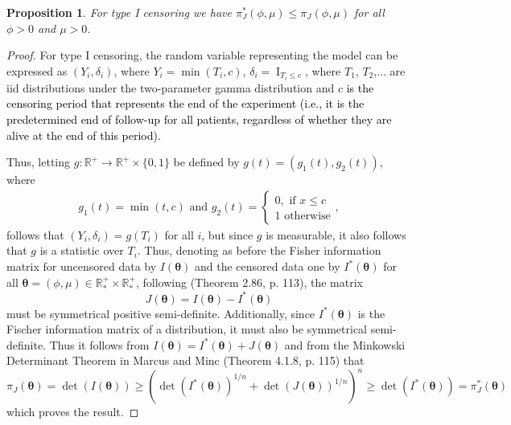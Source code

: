 \documentclass[]{interact}
\newcommand{\f}{\operatorname}
\newcommand{\R}{\mathbb{R}}
\theoremstyle{plain}%
\newtheorem{proposition}[theorem]{Proposition}
\theoremstyle{definition}
\theoremstyle{remark}
\begin{document}
\begin{proposition}\label{jeffreycens} For type I censoring we have $\pi_{J}^*(\phi,\mu)\leq \pi_J(\phi,\mu)$ for all $\phi>0$ and $\mu>0$.
\end{proposition}
\begin{proof} For type I censoring, the random variable representing the model can be expressed as $(Y_i,\delta_i)$, where $Y_i=\min(T_i,c)$, $\delta_i=\f{I}_{T_i\leq c}$, where $T_1$, $T_2$,$\ldots$ are iid distributions under the two-parameter gamma distribution and $c$ \textcolor{black}{is the censoring period that represents the end of the experiment (i.e., it is the predetermined end of follow-up for all patients, regardless of whether they are alive at the end of this period).}

Thus, letting $g:\R^+\to \R^+\times \{0,1\}$ be defined by $g(t)=(g_1(t),g_2(t))$, where
\begin{equation*}
\begin{aligned}
g_1(t) = \min(t,c)\mbox{ and }
g_2(t) = \begin{cases}0,\mbox{ if }x\leq c\\
1\mbox{ otherwise}
\end{cases},
\end{aligned}
\end{equation*}
follows that $(Y_i,\delta_i) = g(T_i)$ for all $i$, but since $g$ is measurable, it also follows that $g$ is a statistic over $T_i$. Thus, denoting as before the Fisher information matrix for uncensored data by $I(\boldsymbol{\theta})$ and the censored data one by $I^*(\boldsymbol{\theta})$ for all $\boldsymbol{\theta}=(\phi,\mu)\in \R^+_*\times \R^+_*$, following \cite{2013-Schervish} (Theorem 2.86, p. 113), the matrix
\begin{equation*} J(\boldsymbol{\theta})=I(\boldsymbol{\theta})-I^*(\boldsymbol{\theta})
\end{equation*}
must be symmetrical positive semi-definite. Additionally, since $I^*(\boldsymbol{\theta})$ is the Fischer information matrix of a distribution, it must also be symmetrical semi-definite. Thus it follows from $I(\boldsymbol{\theta})=I^*(\boldsymbol{\theta})+J(\boldsymbol{\theta})$ and from the Minkowski Determinant Theorem in Marcus and Minc \cite{2010-Marcus} (Theorem 4.1.8, p. 115) that
\begin{equation*} \pi_{J}(\boldsymbol{\theta})=\det(I(\boldsymbol{\theta})) \geq \left(\det\left(I^*(\boldsymbol{\theta})\right)^{1/n} + \det\left(J(\boldsymbol{\theta})\right)^{1/n}\right)^n\geq \det(I^*(\boldsymbol{\theta}))=\pi_{J}^*(\boldsymbol{\theta}) 
\end{equation*}
which proves the result.
\end{proof}
\end{document}
